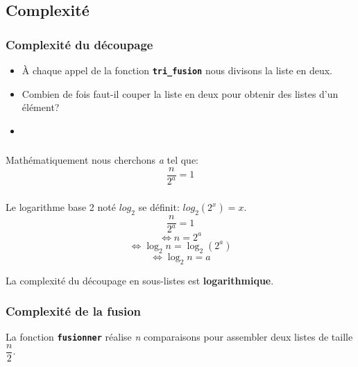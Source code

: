 \documentclass[svgnames,11pt]{beamer}
\begin{document}
\subsection{Complexité}
\begin{frame}
    \frametitle{Complexité du découpage}


    \begin{itemize}
        \item<1-> À chaque appel de la fonction \texttt{\textbf{tri\_fusion}} nous divisons la liste en deux.
        \item<2-> Combien de fois faut-il couper la liste en deux pour obtenir des listes d'un élément?
        \item<3->
    \end{itemize}

\end{frame}
\begin{frame}
    \frametitle{}

    \begin{center}
        Mathématiquement nous cherchons \emph{a} tel que: {\Large $$\dfrac{n}{2^a}=1$$}
    \end{center}



\end{frame}
\begin{frame}
    \frametitle{}
    Le logarithme base 2 noté $log_2$ se définit: $log_2(2^x)=x$.
    $$\dfrac{n}{2^a}=1$$
    $$\Longleftrightarrow n=2^a$$
    $$\Longleftrightarrow \log_2 n = \log_2 (2^a)$$
    $$\Longleftrightarrow \log_2 n = a$$

    \begin{aretenir}[]
        La complexité du découpage en sous-listes est \textbf{logarithmique}.
    \end{aretenir}
\end{frame}
\begin{frame}
    \frametitle{Complexité de la fusion}

    La fonction \textbf{\texttt{fusionner}} réalise \emph{n} comparaisons pour assembler deux listes de taille $\dfrac{n}{2}$.

\end{frame}
\end{document}
